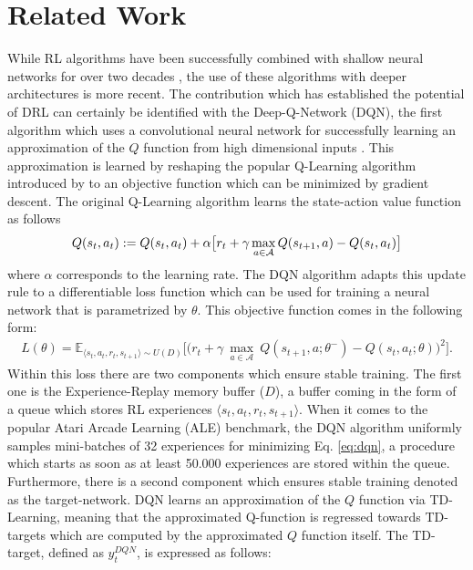 \section{Related Work}
While RL algorithms have been successfully combined with shallow neural networks for over two decades \cite{tesauro1994td}, the use of these algorithms with deeper architectures is more recent. 
The contribution which has established the potential of DRL can certainly be identified with the Deep-Q-Network (DQN), the first algorithm which uses a convolutional neural network for successfully learning an approximation of the $Q$ function from high dimensional inputs \cite{mnih2015human}. This approximation is learned by reshaping the popular Q-Learning algorithm introduced by \citet{watkins1992q} to an objective function which can be minimized by gradient descent. The original Q-Learning algorithm learns the state-action value function as follows
\begin{multline}
Q(s_{t}, a_{t}) := Q(s_{t}, a_{t}) + \alpha \big[r_{t} + \gamma \max_{a \in \cal A} Q(s_{t+1}, a) - Q(s_{t}, a_{t})\big]
\label{eq:q_learning}
\end{multline}
where $\alpha$ corresponds to the learning rate. The DQN algorithm adapts this update rule to a differentiable loss function which can be used for training a neural network that is parametrized by $\theta$. This objective function comes in the following form: 
\begin{multline}
L(\theta) = \mathds{E}_{\langle s_{t},a_{t},r_{t},s_{t+1}\rangle\sim U(D)} \bigg[\big(r_{t} + \gamma \: \underset{a\in \mathcal{A}}{\max}\: Q(s_{t+1}, a; \theta^{-}) - Q(s_{t}, a_{t}; \theta)\big)^{2}\bigg].
\label{eq:dqn}
\end{multline}
Within this loss there are two components which ensure stable training. The first one is the Experience-Replay memory buffer ($D$), a buffer coming in the form of a queue which stores RL experiences $\langle s_{t},a_{t},r_{t},s_{t+1}\rangle$. When it comes to the popular Atari Arcade Learning (ALE) \cite{bellemare2013arcade} benchmark, the DQN algorithm uniformly samples mini-batches of 32 experiences for minimizing Eq. \ref{eq:dqn}, a procedure which starts as soon as at least 50.000 experiences are stored within the queue.
Furthermore, there is a second component which ensures stable training denoted as the target-network. DQN learns an approximation of the $Q$ function via TD-Learning, meaning that the approximated Q-function is regressed towards TD-targets which are computed by the approximated $Q$ function itself. The TD-target, defined as $y^{DQN}_{t}$, is expressed as follows:
